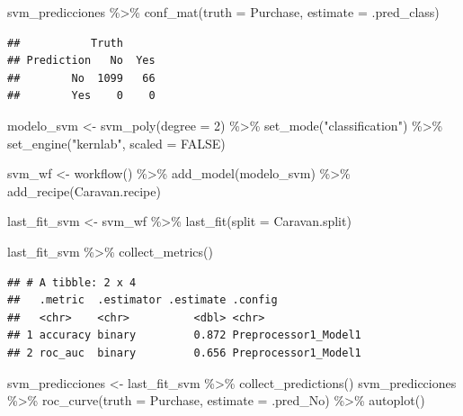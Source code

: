 \documentclass[
  12pt,
]{book}
\newenvironment{Shaded}{\begin{snugshade}}{\end{snugshade}}
\newcommand{\AttributeTok}[1]{\textcolor[rgb]{0.77,0.63,0.00}{#1}}
\newcommand{\ConstantTok}[1]{\textcolor[rgb]{0.00,0.00,0.00}{#1}}
\newcommand{\DecValTok}[1]{\textcolor[rgb]{0.00,0.00,0.81}{#1}}
\newcommand{\FunctionTok}[1]{\textcolor[rgb]{0.00,0.00,0.00}{#1}}
\newcommand{\NormalTok}[1]{#1}
\newcommand{\OtherTok}[1]{\textcolor[rgb]{0.56,0.35,0.01}{#1}}
\newcommand{\SpecialCharTok}[1]{\textcolor[rgb]{0.00,0.00,0.00}{#1}}
\newcommand{\StringTok}[1]{\textcolor[rgb]{0.31,0.60,0.02}{#1}}
\theoremstyle{definition}
\theoremstyle{definition}
\theoremstyle{definition}
\theoremstyle{definition}
\theoremstyle{remark}
\begin{document}
\begin{Shaded}
\begin{Highlighting}[]
\NormalTok{svm\_predicciones }\SpecialCharTok{\%\textgreater{}\%}
    \FunctionTok{conf\_mat}\NormalTok{(}\AttributeTok{truth =}\NormalTok{ Purchase, }\AttributeTok{estimate =}\NormalTok{ .pred\_class)}
\end{Highlighting}
\end{Shaded}

\begin{verbatim}
##           Truth
## Prediction   No  Yes
##        No  1099   66
##        Yes    0    0
\end{verbatim}

\begin{Shaded}
\begin{Highlighting}[]
\NormalTok{modelo\_svm }\OtherTok{\textless{}{-}} \FunctionTok{svm\_poly}\NormalTok{(}\AttributeTok{degree =} \DecValTok{2}\NormalTok{) }\SpecialCharTok{\%\textgreater{}\%}
    \FunctionTok{set\_mode}\NormalTok{(}\StringTok{"classification"}\NormalTok{) }\SpecialCharTok{\%\textgreater{}\%}
    \FunctionTok{set\_engine}\NormalTok{(}\StringTok{"kernlab"}\NormalTok{, }\AttributeTok{scaled =} \ConstantTok{FALSE}\NormalTok{)}

\NormalTok{svm\_wf }\OtherTok{\textless{}{-}} \FunctionTok{workflow}\NormalTok{() }\SpecialCharTok{\%\textgreater{}\%}
    \FunctionTok{add\_model}\NormalTok{(modelo\_svm) }\SpecialCharTok{\%\textgreater{}\%}
    \FunctionTok{add\_recipe}\NormalTok{(Caravan.recipe)}

\NormalTok{last\_fit\_svm }\OtherTok{\textless{}{-}}\NormalTok{ svm\_wf }\SpecialCharTok{\%\textgreater{}\%}
    \FunctionTok{last\_fit}\NormalTok{(}\AttributeTok{split =}\NormalTok{ Caravan.split)}

\NormalTok{last\_fit\_svm }\SpecialCharTok{\%\textgreater{}\%}
    \FunctionTok{collect\_metrics}\NormalTok{()}
\end{Highlighting}
\end{Shaded}

\begin{verbatim}
## # A tibble: 2 x 4
##   .metric  .estimator .estimate .config             
##   <chr>    <chr>          <dbl> <chr>               
## 1 accuracy binary         0.872 Preprocessor1_Model1
## 2 roc_auc  binary         0.656 Preprocessor1_Model1
\end{verbatim}

\begin{Shaded}
\begin{Highlighting}[]
\NormalTok{svm\_predicciones }\OtherTok{\textless{}{-}}\NormalTok{ last\_fit\_svm }\SpecialCharTok{\%\textgreater{}\%}
    \FunctionTok{collect\_predictions}\NormalTok{()}
\NormalTok{svm\_predicciones }\SpecialCharTok{\%\textgreater{}\%}
    \FunctionTok{roc\_curve}\NormalTok{(}\AttributeTok{truth =}\NormalTok{ Purchase, }\AttributeTok{estimate =}\NormalTok{ .pred\_No) }\SpecialCharTok{\%\textgreater{}\%}
    \FunctionTok{autoplot}\NormalTok{()}
\end{Highlighting}
\end{Shaded}
\end{document}
